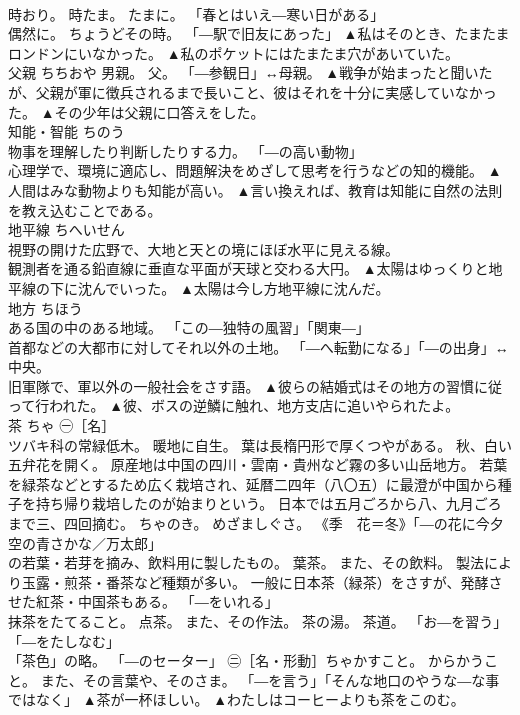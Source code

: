 \documentclass[8pt]{extreport}
\begin{document}
\begin{CJK}{UTF8}{min}
\\	時おり。 時たま。 たまに。 「春とはいえ―寒い日がある」 
\\	偶然に。 ちょうどその時。 「―駅で旧友にあった」	▲私はそのとき、たまたまロンドンにいなかった。 ▲私のポケットにはたまたま穴があいていた。
\\	父親	ちちおや	男親。 父。 「―参観日」↔母親。	▲戦争が始まったと聞いたが、父親が軍に徴兵されるまで長いこと、彼はそれを十分に実感していなかった。 ▲その少年は父親に口答えをした。
\\	知能・智能	ちのう	
\\	物事を理解したり判断したりする力。 「―の高い動物」 
\\	心理学で、環境に適応し、問題解決をめざして思考を行うなどの知的機能。	▲人間はみな動物よりも知能が高い。 ▲言い換えれば、教育は知能に自然の法則を教え込むことである。
\\	地平線	ちへいせん	
\\	視野の開けた広野で、大地と天との境にほぼ水平に見える線。 
\\	観測者を通る鉛直線に垂直な平面が天球と交わる大円。	▲太陽はゆっくりと地平線の下に沈んでいった。 ▲太陽は今し方地平線に沈んだ。
\\	地方	ちほう	
\\	ある国の中のある地域。 「この―独特の風習」「関東―」 
\\	首都などの大都市に対してそれ以外の土地。 「―へ転勤になる」「―の出身」↔中央。 
\\	旧軍隊で、軍以外の一般社会をさす語。	▲彼らの結婚式はその地方の習慣に従って行われた。 ▲彼、ボスの逆鱗に触れ、地方支店に追いやられたよ。
\\	茶	ちゃ	㊀［名］ 
\\	ツバキ科の常緑低木。 暖地に自生。 葉は長楕円形で厚くつやがある。 秋、白い五弁花を開く。 原産地は中国の四川・雲南・貴州など霧の多い山岳地方。 若葉を緑茶などとするため広く栽培され、延暦二四年（八〇五）に最澄が中国から種子を持ち帰り栽培したのが始まりという。 日本では五月ごろから八、九月ごろまで三、四回摘む。 ちゃのき。 めざましぐさ。 《季　花＝冬》「―の花に今夕空の青さかな／万太郎」 
\\	の若葉・若芽を摘み、飲料用に製したもの。 葉茶。 また、その飲料。 製法により玉露・煎茶・番茶など種類が多い。 一般に日本茶（緑茶）をさすが、発酵させた紅茶・中国茶もある。 「―をいれる」 
\\	抹茶をたてること。 点茶。 また、その作法。 茶の湯。 茶道。 「お―を習う」「―をたしなむ」 
\\	「茶色」の略。 「―のセーター」 ㊁［名・形動］ちゃかすこと。 からかうこと。 また、その言葉や、そのさま。 「―を言う」「そんな地口のやうな―な事ではなく」	▲茶が一杯ほしい。 ▲わたしはコーヒーよりも茶をこのむ。

\end{CJK}
\end{document}
